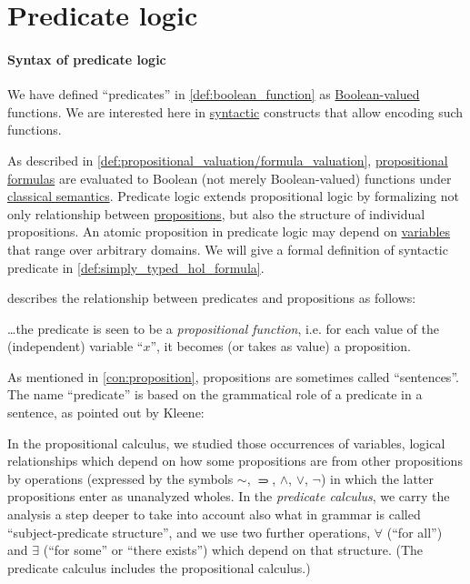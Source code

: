 \section{Predicate logic}\label{sec:predicate_logic}

\paragraph{Syntax of predicate logic}

\begin{remark}\label{rem:predicate_logic}
  We have defined \enquote{predicates} in \cref{def:boolean_function} as \hyperref[con:boolean_value]{Boolean-valued} functions. We are interested here in \hyperref[con:syntax_semantics_duality]{syntactic} constructs that allow encoding such functions.

  As described in \cref{def:propositional_valuation/formula_valuation}, \hyperref[def:propositional_syntax/formula]{propositional formulas} are evaluated to Boolean (not merely Boolean-valued) functions under \hyperref[def:first_order_semantics]{classical semantics}. Predicate logic extends propositional logic by formalizing not only relationship between \hyperref[con:proposition]{propositions}, but also the structure of individual propositions. An atomic proposition in predicate logic may depend on \hyperref[con:variable]{variables} that range over arbitrary domains. We will give a formal definition of syntactic predicate in \cref{def:simply_typed_hol_formula}.

   describes the relationship between predicates and propositions as follows:
  \begin{displayquote}
    \ldots the predicate is seen to be a \textit{propositional function}, i.e. for each value of the (independent) variable \enquote{\( x \)}, it becomes (or takes as value) a proposition.
  \end{displayquote}

  As mentioned in \cref{con:proposition}, propositions are sometimes called \enquote{sentences}. The name \enquote{predicate} is based on the grammatical role of a predicate in a sentence, as pointed out by Kleene:
  \begin{displayquote}
    In the propositional calculus, we studied those occurrences of variables, logical relationships which depend on how some propositions are from other propositions by operations (expressed by the symbols \( \sim \), \( \rightimply \), \( \land \), \( \vee \), \( \neg \)) in which the latter
    propositions enter as unanalyzed wholes. In the \textit{predicate calculus}, we carry the analysis a step deeper to take into account also what in grammar is called \enquote{subject-predicate structure}, and we use two further operations, \( \forall \) (\enquote{for all}) and \( \exists \) (\enquote{for some} or \enquote{there exists}) which depend on that structure. (The predicate calculus includes the propositional calculus.)
  \end{displayquote}


\end{remark}
